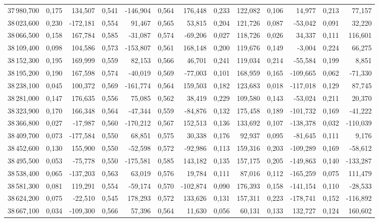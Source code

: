 \begin{longtable}{rrrrrrrrrrrrr}
37\,980,700 & 0,175 & 134,507 & 0,541 & -146,904 & 0,564 & 176,448 & 0,233 & 122,082 & 0,106 & 14,977 & 0,213 & 77,157\\
38\,023,600 & 0,230 & -172,181 & 0,554 & 91,467 & 0,565 & 53,815 & 0,204 & 121,726 & 0,087 & -53,042 & 0,091 & 32,220\\
38\,066,500 & 0,158 & 167,784 & 0,585 & -31,087 & 0,574 & -69,206 & 0,027 & 118,726 & 0,026 & 34,337 & 0,111 & 116,601\\
38\,109,400 & 0,098 & 104,586 & 0,573 & -153,807 & 0,561 & 168,148 & 0,200 & 119,676 & 0,149 & -3,004 & 0,224 & 66,275\\
38\,152,300 & 0,195 & 169,999 & 0,559 & 82,153 & 0,566 & 46,701 & 0,241 & 119,034 & 0,214 & -55,584 & 0,199 & 8,851\\
38\,195,200 & 0,190 & 167,598 & 0,574 & -40,019 & 0,569 & -77,003 & 0,101 & 168,959 & 0,165 & -109,665 & 0,062 & -71,330\\
38\,238,100 & 0,045 & 100,372 & 0,569 & -161,774 & 0,564 & 159,503 & 0,182 & 123,683 & 0,018 & -117,018 & 0,129 & 87,745\\
38\,281,000 & 0,147 & 176,635 & 0,556 & 75,085 & 0,562 & 38,419 & 0,229 & 109,580 & 0,143 & -53,024 & 0,211 & 20,370\\
38\,323,900 & 0,170 & 166,348 & 0,564 & -47,344 & 0,559 & -84,876 & 0,132 & 175,458 & 0,189 & -101,732 & 0,169 & -41,222\\
38\,366,800 & 0,027 & -17,987 & 0,560 & -170,212 & 0,567 & 152,513 & 0,136 & 133,692 & 0,107 & -138,378 & 0,032 & -110,039\\
38\,409,700 & 0,073 & -177,584 & 0,550 & 68,851 & 0,575 & 30,338 & 0,176 & 92,937 & 0,095 & -81,645 & 0,111 & 9,176\\
38\,452,600 & 0,130 & 155,900 & 0,550 & -52,598 & 0,572 & -92,986 & 0,113 & 159,316 & 0,203 & -109,289 & 0,169 & -58,612\\
38\,495,500 & 0,053 & -75,778 & 0,550 & -175,581 & 0,585 & 143,182 & 0,135 & 157,175 & 0,205 & -149,863 & 0,140 & -133,287\\
38\,538,400 & 0,065 & -137,203 & 0,563 & 63,019 & 0,576 & 19,784 & 0,111 & 87,016 & 0,112 & -165,259 & 0,075 & 111,479\\
38\,581,300 & 0,081 & 119,291 & 0,554 & -59,174 & 0,570 & -102,874 & 0,090 & 176,393 & 0,158 & -141,154 & 0,110 & -28,533\\
38\,624,200 & 0,075 & -22,510 & 0,545 & 178,293 & 0,572 & 133,626 & 0,131 & 157,311 & 0,223 & -178,741 & 0,152 & -116,892\\
38\,667,100 & 0,034 & -109,300 & 0,566 & 57,396 & 0,564 & 11,630 & 0,056 & 60,131 & 0,133 & 132,727 & 0,124 & 160,602\\

\end{longtable}
